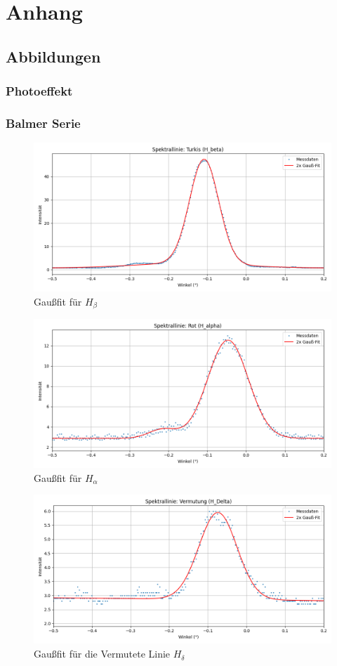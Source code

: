 \chapter{Anhang}
\section{Abbildungen}
\subsection*{Photoeffekt}
\subsection*{Balmer Serie}

\begin{figure}[H]
\centering
\includegraphics[width=0.7\linewidth]{figs/dt_turkis_145_55_5.png}
\caption{Gaußfit für $H_\beta$}
\label{fig:H_b}
\end{figure}

\begin{figure}[H]
\centering
\includegraphics[width=0.7\linewidth]{figs/dt_rot_155_62.png}
\caption{Gaußfit für $H_\alpha$}
\label{fig:H_a}
\end{figure}

\begin{figure}[H]
\centering
\includegraphics[width=0.7\linewidth]{figs/dt_vermutung_145_49.png}
\caption{Gaußfit für die Vermutete Linie $H_\delta$}
\label{fig:H_d}
\end{figure}


